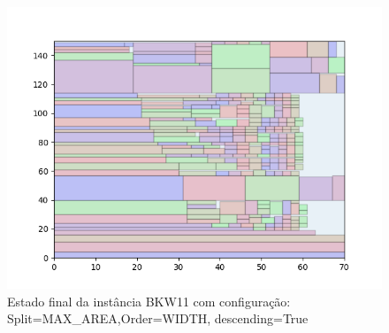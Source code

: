 \begin{figure}[H]
    \centering
    \caption[]{Estado final da instância BKW11 com configuração: Split=MAX_AREA,Order=WIDTH, descending=True}
    \label{fig:bkw11-max_area-width-true}
    \includegraphics[scale=0.5]{output/figures/bkw/bkw11/max_area/width/true/000}
\end{figure}